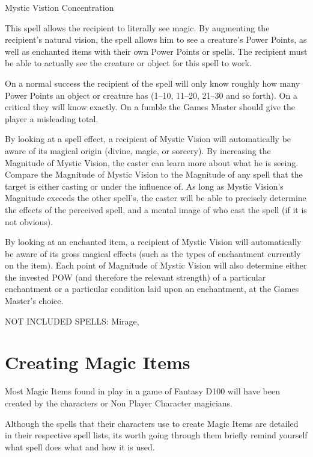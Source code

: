 \begin{samepage}
\begin{rpg-spell}
{Mystic Vistion}
{Concentration}

This spell allows the recipient to literally see magic. By augmenting the recipient’s natural vision, the spell allows him to see a creature’s Power Points, as well as enchanted items with their own Power Points or spells. The recipient must be able to actually see the creature or object for this spell to work.

On a normal success the recipient of the spell will only know roughly how many Power Points an object or creature has (1–10, 11–20, 21–30 and so forth). On a critical they will know exactly. On a fumble the Games Master should give the player a misleading total.

By looking at a spell effect, a recipient of Mystic Vision will automatically be aware of its magical origin (divine, magic, or sorcery). By increasing the Magnitude of Mystic Vision, the caster can learn more about what he is seeing. Compare the Magnitude of Mystic Vision to the Magnitude of any spell that the target is either casting or under the influence of. As long as Mystic Vision’s Magnitude exceeds the other spell’s, the caster will be able to precisely determine the effects of the perceived spell, and a mental image of who cast the spell (if it is not obvious). 

By looking at an enchanted item, a recipient of Mystic Vision will automatically be aware of its gross magical effects (such as the types of enchantment currently on the item). Each point of Magnitude of Mystic Vision will also determine either the invested POW (and therefore the relevant strength) of a particular enchantment or a particular condition laid upon an enchantment, at the Games Master’s choice.
\end{rpg-spell}
\end{samepage}



\iffalse

NOT INCLUDED SPELLS: Mirage, 

\section{Creating Magic Items}

Most Magic Items found in play in a game of Fantasy D100 will have been created by the characters or Non Player Character magicians.

Although the spells that their characters use to create Magic Items are detailed in their respective spell lists, its worth going through them briefly remind yourself what spell does what and how it is used.

